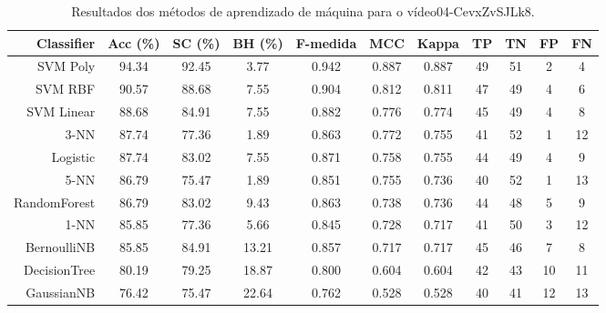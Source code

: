 \begin{table}[!htb]
\centering
\caption{Resultados dos métodos de aprendizado de máquina para o vídeo04-CevxZvSJLk8.}
\label{tab:04-CevxZvSJLk8}
\begin{tabular}{r|c|c|c|c|c|c|c|c|c|c}
\hline\hline
Classifier & Acc (\%) & SC (\%) & BH (\%) & F-medida & MCC & Kappa & TP & TN & FP & FN \\ \hline
SVM Poly & 94.34 & 92.45 & 3.77 & 0.942 & 0.887 & 0.887 & 49 & 51 & 2 & 4 \\ 
SVM RBF & 90.57 & 88.68 & 7.55 & 0.904 & 0.812 & 0.811 & 47 & 49 & 4 & 6 \\ 
SVM Linear & 88.68 & 84.91 & 7.55 & 0.882 & 0.776 & 0.774 & 45 & 49 & 4 & 8 \\ 
3-NN & 87.74 & 77.36 & 1.89 & 0.863 & 0.772 & 0.755 & 41 & 52 & 1 & 12 \\ 
Logistic & 87.74 & 83.02 & 7.55 & 0.871 & 0.758 & 0.755 & 44 & 49 & 4 & 9 \\ 
5-NN & 86.79 & 75.47 & 1.89 & 0.851 & 0.755 & 0.736 & 40 & 52 & 1 & 13 \\ 
RandomForest & 86.79 & 83.02 & 9.43 & 0.863 & 0.738 & 0.736 & 44 & 48 & 5 & 9 \\ 
1-NN & 85.85 & 77.36 & 5.66 & 0.845 & 0.728 & 0.717 & 41 & 50 & 3 & 12 \\ 
BernoulliNB & 85.85 & 84.91 & 13.21 & 0.857 & 0.717 & 0.717 & 45 & 46 & 7 & 8 \\ 
DecisionTree & 80.19 & 79.25 & 18.87 & 0.800 & 0.604 & 0.604 & 42 & 43 & 10 & 11 \\ 
GaussianNB & 76.42 & 75.47 & 22.64 & 0.762 & 0.528 & 0.528 & 40 & 41 & 12 & 13 \\ 
\hline\hline
\end{tabular}
\end{table}
